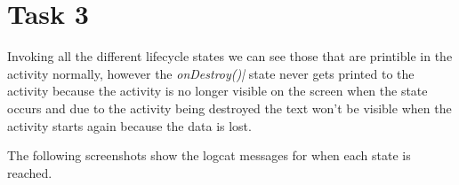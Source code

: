\documentclass[11pt,english,numbers=endperiod,parskip=half]{scrartcl}
\begin{document}
\section{Task 3}
\raggedright
Invoking all the different lifecycle states we can see those that are printible in the activity normally, however the \textit{onDestroy()|} state never gets printed to the activity because the activity is no longer visible on the screen when the state occurs and due to the activity being destroyed the text won't be visible when the activity starts again because the data is lost.

The following screenshots show the logcat messages for when each state is reached.
\bigskip
{}\\
\bigskip
{}\\
\bigskip
\end{document}
